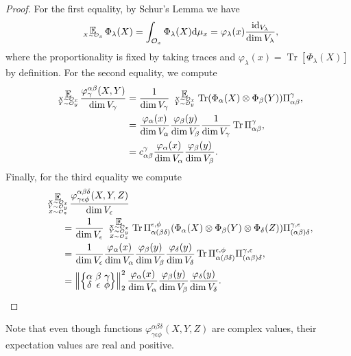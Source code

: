 \documentclass[pdflatex, sn-mathphys-num]{sn-jnl} %
\makeatletter
\theoremstyle{plain}
\theoremstyle{definition}
\DeclareMathOperator{\Tr}{Tr}
\DeclareMathOperator{\id}{id}
\DeclareMathOperator*{\expect}{\mathbb{E}}
\newcommand{\diff}{\mathrm{d}}
\newcommand{\orbit}{\mathcal O}
\newcommand{\norm}[1]{\left\lVert#1\right\rVert}
\newcommand{\ot}{\otimes} %
\newcommand{\vp}{\varphi} %
\newcommand{\projl}{\Pi_{(\ya \yb) \yd}^{\yc, \ye}}
\newcommand{\projr}{\Pi_{\ya (\yb \yd)}^{\ye, \yf}}
\newcommand{\ex}{x}
\newcommand{\ey}{y}
\newcommand{\ez}{z}
\newcommand{\ya}{\alpha}
\newcommand{\yb}{\beta}
\newcommand{\yc}{\gamma}
\newcommand{\yd}{\delta}
\newcommand{\ye}{\epsilon}
\newcommand{\yf}{\phi}
\newcommand{\yx}{\lambda}
\newcommand{\tightcurlysixj}[1]{
\begingroup
\arraycolsep=1.5pt
\renewcommand{\arraystretch}{0.3}
\left\{\!\begin{array}{ccc}
    #1
\end{array}\!\right\}
\endgroup
}
\newcommand{\abcdefsymbol}{\tightcurlysixj{\alpha & \beta & \gamma \\ \delta & \epsilon & \phi}}
\newcommand{\tightsinglesubstack}[2]{
\begingroup
    \renewcommand{\arraystretch}{0.3}
    \begin{array}{c@{}} #1 \\ {\scriptscriptstyle #2} \end{array}
\endgroup
}
\newcommand{\tightdoublesubstack}[3]{
\begingroup
    \renewcommand{\arraystretch}{0.3}
    \begin{array}{c@{}} #1 \\ {\scriptscriptstyle #2} \\ {\scriptscriptstyle #3} \end{array}
\endgroup
}
\newcommand{\tighttriplesubstack}[4]{
\begingroup
    \renewcommand{\arraystretch}{0.3}
    \begin{array}{c@{}} #1 \\ {\scriptscriptstyle #2} \\ {\scriptscriptstyle #3} \\ {\scriptscriptstyle #4} \end{array}
\endgroup
}
\makeatother
\begin{document}
\begin{proof}
    For the first equality, by Schur's Lemma we have
    \begin{equation}
        \tightsinglesubstack{\expect}{X \sim \orbit_{\ex}}\, \Phi_\yx(X) = \int_{\orbit_x} \Phi_\yx(X) \diff\mu_x = \vp_\yx(x) \frac{\id_{V_\yx}}{\dim V_\yx},
    \end{equation}
    where the proportionality is fixed by taking traces and $\vp_\yx(x)  = \Tr[\Phi_\yx(X)]$ by definition.
    For the second equality, we compute
    \begin{align}
        \begin{split}
            \tightdoublesubstack{\expect}{X \sim \orbit_{\ex}}{Y \sim \orbit_{\ey}}\, \frac{\vp^{\ya \yb}_\yc(X, Y)}{\dim V_\yc}
            &= \frac{1}{\dim V_\yc} \tightdoublesubstack{\expect}{X \sim \orbit_{\ex}}{Y \sim \orbit_{\ey}}\, \Tr (\Phi_\ya(X) \ot \Phi_\yb(Y)) \Pi_{\ya \yb}^\yc, \\
            &= \frac{\vp_\ya(x)}{\dim V_\ya}\frac{\vp_\yb(y)}{\dim V_\yb} \frac{1}{\dim V_\yc} \Tr \Pi_{\ya \yb}^\yc, \\
            &= c_{\ya \yb}^\yc \frac{\vp_\ya(x)}{\dim V_\ya}\frac{\vp_\yb(y)}{\dim V_\yb}.
        \end{split}
    \end{align}
    Finally, for the third equality we compute
    \begin{align}
        \begin{split}
            &\tighttriplesubstack{\expect}{X \sim \orbit_{\ex}}{Y \sim \orbit_{\ey}}{Z \sim \orbit_{\ez}}\, \frac{\vp^{\ya \yb \yd}_{\yc \ye \yf}(X, Y, Z)}{\dim V_\ye}\\
            &\qquad=
            \frac{1}{{\dim V_\ye}} \tighttriplesubstack{\expect}{X \sim \orbit_{\ex}}{Y \sim \orbit_{\ey}}{Z \sim \orbit_{\ez}}\,
            \Tr \projr (\Phi_\ya(X) \ot \Phi_\yb(Y) \ot \Phi_\yd(Z))\projl, \\
            &\qquad=
            \frac{1}{{\dim V_\ye}}  \frac{\vp_\ya(x)}{\dim V_\ya}\frac{\vp_\yb(y)}{\dim V_\yb}
            \frac{\vp_\yd(y)}{\dim V_\yd} \Tr \projr \projl, \\
            &\qquad=
            \norm{\abcdefsymbol}_2^2 \frac{\vp_\ya(x)}{\dim V_\ya}\frac{\vp_\yb(y)}{\dim V_\yb}
            \frac{\vp_\yd(y)}{\dim V_\yd}.
        \end{split}
    \end{align}
\end{proof}
Note that even though functions $\vp^{\ya \yb \yd}_{\yc \ye \yf}(X, Y, Z)$ are complex values, their expectation values are real and positive.
\end{document}
